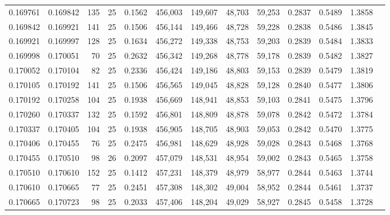 \begin{tabular}{rrrrrrrrrrrrr}
0.169761 & 0.169842 &   135 &  25 &                                     0.1562 & 456,003 & 149,607 &  48,703 &  59,253 & 0.2837 & 0.5489 & 1.3858 \\
0.169842 & 0.169921 &   141 &  25 &                                     0.1506 & 456,144 & 149,466 &  48,728 &  59,228 & 0.2838 & 0.5486 & 1.3845 \\
0.169921 & 0.169997 &   128 &  25 &                                     0.1634 & 456,272 & 149,338 &  48,753 &  59,203 & 0.2839 & 0.5484 & 1.3833 \\
0.169998 & 0.170051 &    70 &  25 &                                     0.2632 & 456,342 & 149,268 &  48,778 &  59,178 & 0.2839 & 0.5482 & 1.3827 \\
0.170052 & 0.170104 &    82 &  25 &                                     0.2336 & 456,424 & 149,186 &  48,803 &  59,153 & 0.2839 & 0.5479 & 1.3819 \\
0.170105 & 0.170192 &   141 &  25 &                                     0.1506 & 456,565 & 149,045 &  48,828 &  59,128 & 0.2840 & 0.5477 & 1.3806 \\
0.170192 & 0.170258 &   104 &  25 &                                     0.1938 & 456,669 & 148,941 &  48,853 &  59,103 & 0.2841 & 0.5475 & 1.3796 \\
0.170260 & 0.170337 &   132 &  25 &                                     0.1592 & 456,801 & 148,809 &  48,878 &  59,078 & 0.2842 & 0.5472 & 1.3784 \\
0.170337 & 0.170405 &   104 &  25 &                                     0.1938 & 456,905 & 148,705 &  48,903 &  59,053 & 0.2842 & 0.5470 & 1.3775 \\
0.170406 & 0.170455 &    76 &  25 &                                     0.2475 & 456,981 & 148,629 &  48,928 &  59,028 & 0.2843 & 0.5468 & 1.3768 \\
0.170455 & 0.170510 &    98 &  26 &                                     0.2097 & 457,079 & 148,531 &  48,954 &  59,002 & 0.2843 & 0.5465 & 1.3758 \\
0.170510 & 0.170610 &   152 &  25 &                                     0.1412 & 457,231 & 148,379 &  48,979 &  58,977 & 0.2844 & 0.5463 & 1.3744 \\
0.170610 & 0.170665 &    77 &  25 &                                     0.2451 & 457,308 & 148,302 &  49,004 &  58,952 & 0.2844 & 0.5461 & 1.3737 \\
0.170665 & 0.170723 &    98 &  25 &                                     0.2033 & 457,406 & 148,204 &  49,029 &  58,927 & 0.2845 & 0.5458 & 1.3728 \\

\end{tabular}

